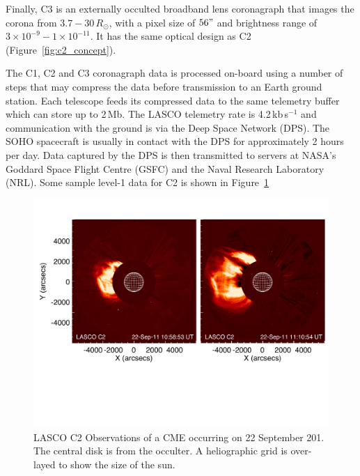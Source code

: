 Finally, C3 is an externally occulted broadband lens coronagraph that images the corona from $3.7-30\,R_{\odot}$, with a pixel size of $56"$ and brightness range of $3\times10^{-9} - 1\times10^{-11}$. It has the same optical design as C2 (Figure~\ref{fig:c2_concept}).

The C1, C2 and C3 coronagraph data is processed on-board using a number of steps that may compress the data before transmission to an Earth ground station. Each telescope feeds its compressed data to the same telemetry buffer which can store up to 2\,Mb. The  LASCO telemetry rate is 4.2\,kb\,s$^{-1}$ and communication with the ground is via the Deep Space Network (DPS). The SOHO spacecraft is usually in contact with the DPS for approximately 2 hours per day. Data captured by the DPS is then transmitted to servers at NASA's Goddard Space Flight Centre (GSFC) and the Naval Research Laboratory (NRL). Some sample level-1 data for C2 is shown in Figure~\ref{fig:lasco_c2_obs}
\begin{figure}[!t]
\begin{center}
\includegraphics[scale=0.55, trim=2cm 6cm 1cm 2cm]{images/lasco_c2_thesis.pdf}
\caption[LASCO C2 Observations]{LASCO C2 Observations of a CME occurring on 22 September 201. The central disk is from the occulter. A heliographic grid is over-layed to show the size of the sun.}
\label{fig:lasco_c2_obs}
\end{center}
\end{figure}


